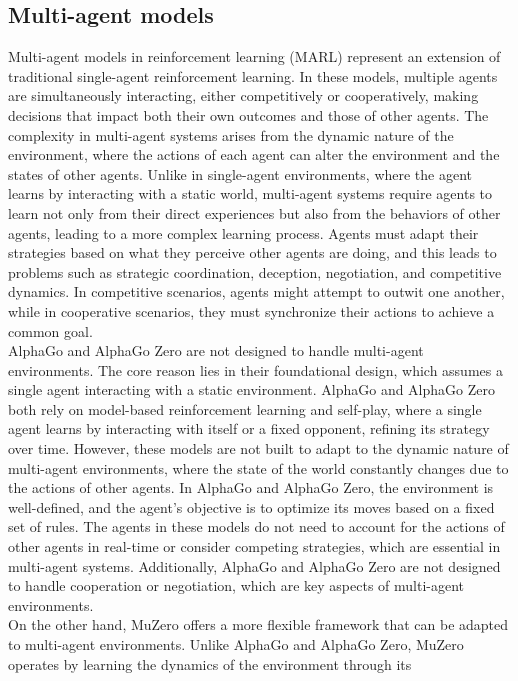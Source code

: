 \subsection*{Multi-agent models}
Multi-agent models in reinforcement learning (MARL) represent an extension of
traditional single-agent reinforcement learning. In these models, multiple
agents are simultaneously interacting, either competitively or cooperatively,
making decisions that impact both their own outcomes and those of other agents.
The complexity in multi-agent systems arises from the dynamic nature of the
environment, where the actions of each agent can alter the environment and the
states of other agents. Unlike in single-agent environments, where the agent
learns by interacting with a static world, multi-agent systems require agents
to learn not only from their direct experiences but also from the behaviors of
other agents, leading to a more complex learning process. Agents must adapt
their strategies based on what they perceive other agents are doing, and this
leads to problems such as strategic coordination, deception, negotiation, and
competitive dynamics. In competitive scenarios, agents might attempt to outwit
one another, while in cooperative scenarios, they must synchronize their
actions to achieve a common goal\cite{AD2}.\\ AlphaGo and AlphaGo Zero are not
designed to handle multi-agent environments. The core reason lies in their
foundational design, which assumes a single agent interacting with a static
environment. AlphaGo and AlphaGo Zero both rely on model-based reinforcement
learning and self-play, where a single agent learns by interacting with itself
or a fixed opponent, refining its strategy over time. However, these models are
not built to adapt to the dynamic nature of multi-agent environments, where the
state of the world constantly changes due to the actions of other agents. In
AlphaGo and AlphaGo Zero, the environment is well-defined, and the agent’s
objective is to optimize its moves based on a fixed set of rules. The agents in
these models do not need to account for the actions of other agents in
real-time or consider competing strategies, which are essential in multi-agent
systems. Additionally, AlphaGo and AlphaGo Zero are not designed to handle
cooperation or negotiation, which are key aspects of multi-agent
environments.\\ On the other hand, MuZero offers a more flexible framework that
can be adapted to multi-agent environments. Unlike AlphaGo and AlphaGo Zero,
MuZero operates by learning the dynamics of the environment through its
